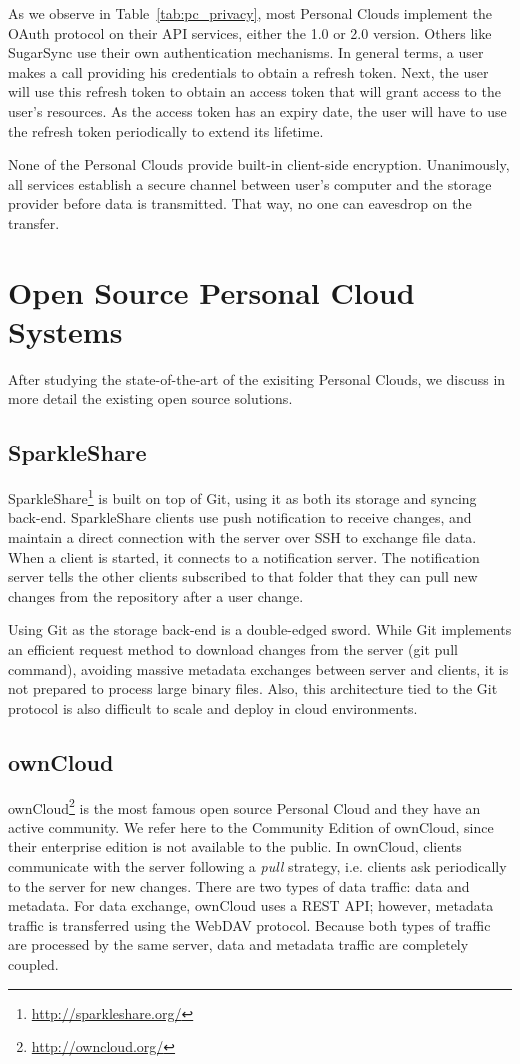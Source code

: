 As we observe in Table~\ref{tab:pc_privacy}, most Personal Clouds implement the OAuth protocol on their API services, either the 1.0 or 2.0 version. Others like SugarSync use their own authentication mechanisms. In general terms, a user makes a call providing his credentials to obtain a refresh token. Next, the user will use this refresh token to obtain an access token that will grant access to the user's resources. As the access token has an expiry date, the user will have to use the refresh token periodically to extend its lifetime.

None of the Personal Clouds provide built-in client-side encryption. Unanimously, all services establish a secure channel between user's computer and the storage provider before data is transmitted. That way, no one can eavesdrop on the transfer.

\section{Open Source Personal Cloud Systems}

After studying the state-of-the-art of the exisiting Personal Clouds, we discuss in more detail
the existing open source solutions.

\subsection{SparkleShare}

SparkleShare\footnote{\url{http://sparkleshare.org/}} is built on top of Git, using it 
as both its storage and syncing back-end. SparkleShare clients use push notification
to receive changes, and maintain a direct connection with the server over SSH to exchange file data.
When a client is started, it connects to a notification server. The notification server tells the other
clients subscribed to that folder that they can pull new changes from the repository after a user
change. 

Using Git as the storage back-end is a double-edged sword. While Git implements an efficient request
method to download changes from the server (git pull command), avoiding massive metadata exchanges
between server and clients, it is not prepared to process large binary files. Also, this architecture
tied to the Git protocol is also difficult to scale and deploy in cloud environments.

\subsection{ownCloud}
ownCloud\footnote{\url{http://owncloud.org/}} is the most famous open source  Personal Cloud 
and they have an active community. We refer here to the Community Edition of ownCloud, since their enterprise edition is not available to the public. In ownCloud, clients communicate with the server following a \textit{pull} strategy, i.e. clients ask periodically to the server for new changes. There are two types of data traffic: data and metadata. For data exchange, ownCloud uses a REST API; however, metadata traffic is transferred using the WebDAV protocol. 
Because both types of traffic are processed by the same server, data and metadata traffic are completely coupled.

